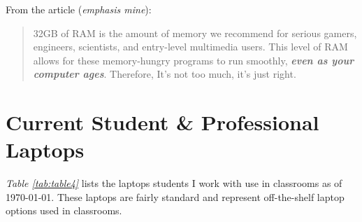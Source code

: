 From the article (\emph{emphasis mine}):
\begin{leftbar} \begin{quote}
	32GB of RAM is the amount of memory we recommend for serious gamers, engineers, scientists, and entry-level multimedia users. This level of RAM allows for these memory-hungry programs to run smoothly, \textbf{\emph{even as your computer ages}}. Therefore, It's not too much, it's just right.
	\end{quote}
\end{leftbar}

\pagebreak\hypertarget{current-student-professional-laptops}{}\section{Current Student \& Professional Laptops}\label{current-student-professional-laptops}
\textit{Table \ref{tab:table4}} lists the laptops students I work with use in classrooms as of {\today}. These laptops are fairly standard and represent off-the-shelf laptop options used in classrooms.

\pagebreak

